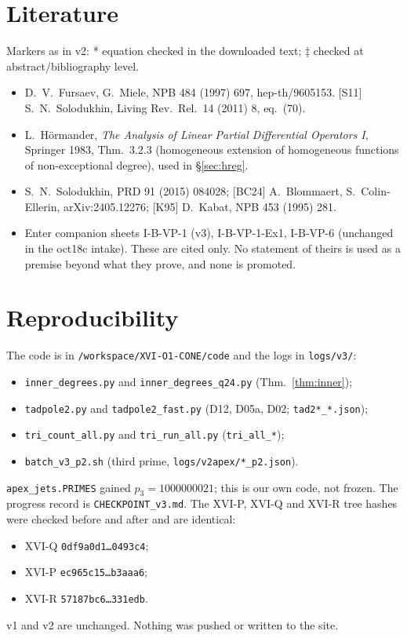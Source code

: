 \section{Literature}
Markers as in v2: * equation checked in the downloaded text; ‡ checked at abstract/bibliography level.
\begin{itemize}
\item[*] [FM97] D.~V.~Fursaev, G.~Miele, NPB 484 (1997) 697, hep-th/9605153. [S11] S.~N.~Solodukhin, Living Rev.\ Rel.\ 14 (2011) 8, eq.~(70).
\item[‡] [H83] L.~Hörmander, \emph{The Analysis of Linear Partial Differential Operators I}, Springer 1983, Thm.~3.2.3 (homogeneous extension of homogeneous functions of non-exceptional degree), used in \S\ref{sec:hreg}.
\item[‡] [S15] S.~N.~Solodukhin, PRD 91 (2015) 084028; [BC24] A.~Blommaert, S.~Colin-Ellerin, arXiv:2405.12276; [K95] D.~Kabat, NPB 453 (1995) 281.
\item[cited input] Enter companion sheets I-B-VP-1 (v3), I-B-VP-1-Ex1, I-B-VP-6 (unchanged in the oct18c intake). These are cited only. No statement of theirs is used as a premise beyond what they prove, and none is promoted.
\end{itemize}

\section{Reproducibility}\label{sec:repro}
The code is in \texttt{/workspace/XVI-O1-CONE/code} and the logs in \texttt{logs/v3/}:
\begin{itemize}
\item \texttt{inner\_degrees.py} and \texttt{inner\_degrees\_q24.py} (Thm.~\ref{thm:inner});
\item \texttt{tadpole2.py} and \texttt{tadpole2\_fast.py} (D12, D05a, D02; \texttt{tad2*\_*.json});
\item \texttt{tri\_count\_all.py} and \texttt{tri\_run\_all.py} (\texttt{tri\_all\_*});
\item \texttt{batch\_v3\_p2.sh} (third prime, \texttt{logs/v2apex/*\_p2.json}).
\end{itemize}
\texttt{apex\_jets.PRIMES} gained $p_3=1000000021$; this is our own code, not frozen. The progress record is \texttt{CHECKPOINT\_v3.md}. The XVI-P, XVI-Q and XVI-R tree hashes were checked before and after and are identical:
\begin{itemize}
\item XVI-Q \texttt{0df9a0d1\dots0493c4};
\item XVI-P \texttt{ec965c15\dots b3aaa6};
\item XVI-R \texttt{57187bc6\dots 331edb}.
\end{itemize}
v1 and v2 are unchanged. Nothing was pushed or written to the site.

